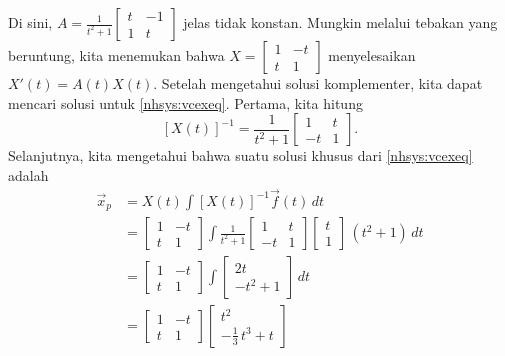 \begin{example}
Di sini, $A = 
\frac{1}{t^2+1}
\left[ \begin{smallmatrix}
t & -1 \\
1 & t
\end{smallmatrix} \right]$ jelas tidak konstan.
Mungkin melalui tebakan yang beruntung, kita menemukan bahwa
$X = 
\left[ \begin{smallmatrix}
1 & -t \\
t & 1
\end{smallmatrix} \right]$ menyelesaikan
$X'(t) = A(t) X(t)$.  Setelah mengetahui solusi komplementer, kita dapat mencari
solusi untuk \eqref{nhsys:vcexeq}.  Pertama, kita hitung
\begin{equation*}
\left[ X(t) \right]^{-1}
=
\frac{1}{t^2+1}
\begin{bmatrix}
1 & t \\
-t & 1
\end{bmatrix} .
\end{equation*}
Selanjutnya, kita mengetahui bahwa suatu solusi khusus dari
\eqref{nhsys:vcexeq} adalah
\begin{equation*}
\begin{split}
\vec{x}_p & = 
X(t)
\int \left[X(t)\right]^{-1}\vec{f}(t) \, dt 
\\
& =
\begin{bmatrix}
1 & -t \\
t & 1
\end{bmatrix} 
\int
\frac{1}{t^2+1}
\begin{bmatrix}
1 & t \\
-t & 1
\end{bmatrix}
\begin{bmatrix} t \\ 1 \end{bmatrix} \,(t^2+1) 
\,dt
\\
& =
\begin{bmatrix}
1 & -t \\
t & 1
\end{bmatrix} 
\int
\begin{bmatrix}
2t \\
-t^2 + 1
\end{bmatrix} 
\,dt
\\
& =
\begin{bmatrix}
1 & -t \\
t & 1
\end{bmatrix} 
\begin{bmatrix}
t^2 \\
-\frac{1}{3}\,t^3 + t
\end{bmatrix} 
\\

\end{split}
\end{equation*}
\end{example}
